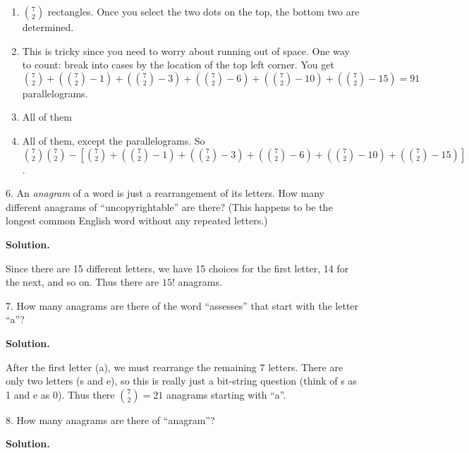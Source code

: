 \documentclass[10pt,]{book}
\theoremstyle{plain}
\theoremstyle{definition}
\theoremstyle{definition}
\theoremstyle{definition}
\numberwithin{equation}{section}
\begin{document}
\begin{exerciselist}
\begin{enumerate}[label=(\alph*)]
\item\hypertarget{li-486}{}\({7 \choose 2}\) rectangles.  Once you select the two dots on the top, the bottom two are determined.%
\item\hypertarget{li-487}{} This is tricky since you need to worry about running out of space.  One way to count: break into cases by the location of the top left corner.  You get \({7 \choose 2} + ({7 \choose 2}-1) + ({7 \choose 2} - 3) + ({7 \choose 2} - 6) + ({7 \choose 2} - 10) + ({7 \choose 2} - 15) = 91\) parallelograms. %
\item\hypertarget{li-488}{} All of them %
\item\hypertarget{li-489}{} All of them, except the parallelograms.  So \({7\choose 2}{7\choose 2} - \left[ {7 \choose 2} + ({7 \choose 2}-1) + ({7 \choose 2} - 3) + ({7 \choose 2} - 6) + ({7 \choose 2} - 10) + ({7 \choose 2} - 15) \right]\). %
\end{enumerate}
\item[6.]\hypertarget{exercise-65}{}
                An \emph{anagram} of a word is just a rearrangement of its letters. How many different anagrams of ``uncopyrightable'' are there? (This happens to be the longest common English word without any repeated letters.)
\par\smallskip
\par\smallskip
\noindent\textbf{Solution.}\hypertarget{solution-96}{}\quad

                Since there are 15 different letters, we have 15 choices for the first letter, 14 for the next, and so on. Thus there are \(15!\) anagrams.
\item[7.]\hypertarget{exercise-66}{}
                How many anagrams are there of the word ``assesses'' that start with the letter ``a''?
\par\smallskip
\par\smallskip
\noindent\textbf{Solution.}\hypertarget{solution-97}{}\quad

                After the first letter (a), we must rearrange the remaining 7 letters. There are only two letters (s and e), so this is really just a bit-string question (think of s as 1 and e as 0). Thus there \({7 \choose 2} = 21\) anagrams starting with ``a''.
\item[8.]\hypertarget{exercise-67}{}
                How many anagrams are there of ``anagram''?
\par\smallskip
\par\smallskip
\noindent\textbf{Solution.}\hypertarget{solution-98}{}\quad


\end{exerciselist}
\end{document}
